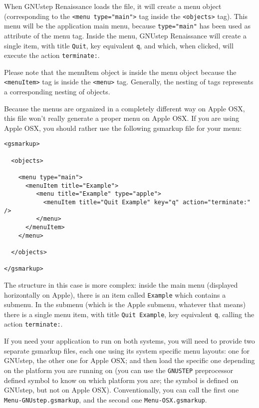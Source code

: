 \documentclass[a4paper]{article}
\begin{document}
When GNUstep Renaissance loads the file, it will create a menu object
(corresponding to the \texttt{<menu type="main">} tag inside the
\texttt{<objects>} tag).  This menu will be the application main menu,
because \texttt{type="main"} has been used as attribute of the menu
tag.  Inside the menu, GNUstep Renaissance will create a single item,
with title \texttt{Quit}, key equivalent \texttt{q}, and which, when
clicked, will execute the action \texttt{terminate:}.

Please note that the menuItem object is inside the menu object because
the \texttt{<menuItem>} tag is inside the \texttt{<menu>} tag.
Generally, the nesting of tags represents a corresponding nesting of
objects.

Because the menus are organized in a completely different way on Apple
OSX, this file won't really generate a proper menu on Apple OSX.  If
you are using Apple OSX, you should rather use the following gsmarkup
file for your menu:
\begin{verbatim}
<gsmarkup>

  <objects>

    <menu type="main">
      <menuItem title="Example">
         <menu title="Example" type="apple">
           <menuItem title="Quit Example" key="q" action="terminate:" />
         </menu>
      </menuItem>
    </menu>
 
  </objects>

</gsmarkup>
\end{verbatim}
The structure in this case is more complex: inside the main menu
(displayed horizontally on Apple), there is an item called
\texttt{Example} which contains a submenu.  In the submenu (which
is the Apple submenu, whatever that means) there is a single menu
item, with title \texttt{Quit Example}, key equivalent \texttt{q},
calling the action \texttt{terminate:}.

If you need your application to run on both systems, you will need to
provide two separate gsmarkup files, each one using its system
specific menu layouts: one for GNUstep, the other one for Apple OSX;
and then load the specific one depending on the platform you are
running on (you can use the \texttt{GNUSTEP} preprocessor defined
symbol to know on which platform you are; the symbol is defined on
GNUstep, but not on Apple OSX).  Conventionally, you can call the
first one \texttt{Menu-GNUstep.gsmarkup}, and the second one
\texttt{Menu-OSX.gsmarkup}.
\end{document}
